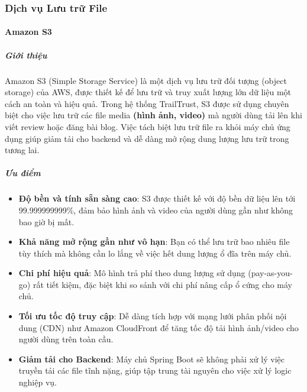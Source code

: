 
\subsubsection{Dịch vụ Lưu trữ File}

\paragraph{Amazon S3}

\subparagraph{Giới thiệu}
Amazon S3 (Simple Storage Service) là một dịch vụ lưu trữ đối tượng (object storage) của AWS, được thiết kế để lưu trữ và truy xuất lượng lớn dữ liệu một cách an toàn và hiệu quả. Trong hệ thống TrailTrust, S3 được sử dụng chuyên biệt cho việc lưu trữ các file media \textbf{(hình ảnh, video)} mà người dùng tải lên khi viết review hoặc đăng bài blog. Việc tách biệt lưu trữ file ra khỏi máy chủ ứng dụng giúp giảm tải cho backend và dễ dàng mở rộng dung lượng lưu trữ trong tương lai.

\subparagraph{Ưu điểm}
\begin{itemize}
    \item \textbf{Độ bền và tính sẵn sàng cao}: S3 được thiết kế với độ bền dữ liệu lên tới 99.999999999\%, đảm bảo hình ảnh và video của người dùng gần như không bao giờ bị mất.
    \item \textbf{Khả năng mở rộng gần như vô hạn}: Bạn có thể lưu trữ bao nhiêu file tùy thích mà không cần lo lắng về việc hết dung lượng ổ đĩa trên máy chủ.
    \item \textbf{Chi phí hiệu quả}: Mô hình trả phí theo dung lượng sử dụng (pay-as-you-go) rất tiết kiệm, đặc biệt khi so sánh với chi phí nâng cấp ổ cứng cho máy chủ.
    \item \textbf{Tối ưu tốc độ truy cập}: Dễ dàng tích hợp với mạng lưới phân phối nội dung (CDN) như Amazon CloudFront để tăng tốc độ tải hình ảnh/video cho người dùng trên toàn cầu.
    \item \textbf{Giảm tải cho Backend}: Máy chủ Spring Boot sẽ không phải xử lý việc truyền tải các file tĩnh nặng, giúp tập trung tài nguyên cho việc xử lý logic nghiệp vụ.
\end{itemize}

